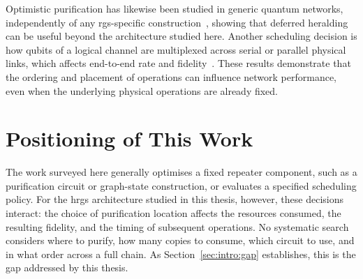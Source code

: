Optimistic purification has likewise been studied in generic quantum networks, independently of any \Gls{rgs}-specific construction~\cite{Mobayenjarihani2023Optimistic}, showing that deferred heralding can be useful beyond the architecture studied here. Another scheduling decision is how qubits of a logical channel are multiplexed across serial or parallel physical links, which affects end-to-end rate and fidelity~\cite{Meter2007Communication}. These results demonstrate that the ordering and placement of operations can influence network performance, even when the underlying physical operations are already fixed.

\section{Positioning of This Work}
\label{sec:rw:positioning}

The work surveyed here generally optimises a fixed repeater component, such as a purification circuit or graph-state construction, or evaluates a specified scheduling policy. For the \Gls{hrgs} architecture studied in this thesis, however, these decisions interact: the choice of purification location affects the resources consumed, the resulting fidelity, and the timing of subsequent operations. No systematic search considers where to purify, how many copies to consume, which circuit to use, and in what order across a full chain. As Section~\ref{sec:intro:gap} establishes, this is the gap addressed by this thesis.

